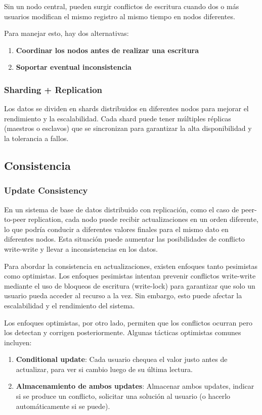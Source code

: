 \documentclass{article}
\begin{document}
		Sin un nodo central, pueden surgir conflictos de escritura cuando dos o más usuarios modifican el mismo registro al mismo tiempo en nodos diferentes. 
		
		Para manejar esto, hay dos alternativas:
		\begin{enumerate}
			\item {\textbf{Coordinar los nodos antes de realizar una escritura}}
			
			\item {\textbf{Soportar eventual inconsistencia}}
		\end{enumerate}
		
		
		
		\subsubsection{Sharding + Replication}
		Los datos se dividen en shards distribuidos en diferentes nodos para mejorar el rendimiento y la escalabilidad. Cada shard puede tener múltiples réplicas (maestros o esclavos) que se sincronizan para garantizar la alta disponibilidad y la tolerancia a fallos.
		
		\subsection{Consistencia}
		\subsubsection{Update Consistency}
		En un sistema de base de datos distribuido con replicación, como el caso de peer-to-peer replication, cada nodo puede recibir actualizaciones en un orden diferente, lo que podría conducir a diferentes valores finales para el mismo dato en diferentes nodos. Esta situación puede aumentar las posibilidades de conflicto write-write y llevar a inconsistencias en los datos.
		
		Para abordar la consistencia en actualizaciones, existen enfoques tanto pesimistas como optimistas. Los enfoques pesimistas intentan prevenir conflictos write-write mediante el uso de bloqueos de escritura (write-lock) para garantizar que solo un usuario pueda acceder al recurso a la vez. Sin embargo, esto puede afectar la escalabilidad y el rendimiento del sistema.
		
		Los enfoques optimistas, por otro lado, permiten que los conflictos ocurran pero los detectan y corrigen posteriormente. 
		Algunas tácticas optimistas comunes incluyen:
		\begin{enumerate}
			\item {\textbf{Conditional update}}: Cada usuario chequea el valor justo antes de actualizar, para ver si cambio
			luego de su última lectura.
			
			\item {\textbf{Almacenamiento de ambos updates}}: Almacenar ambos updates, indicar si se produce un conflicto, solicitar
			una solución al usuario (o hacerlo automáticamente si se puede).
		\end{enumerate}
		
\end{document}
